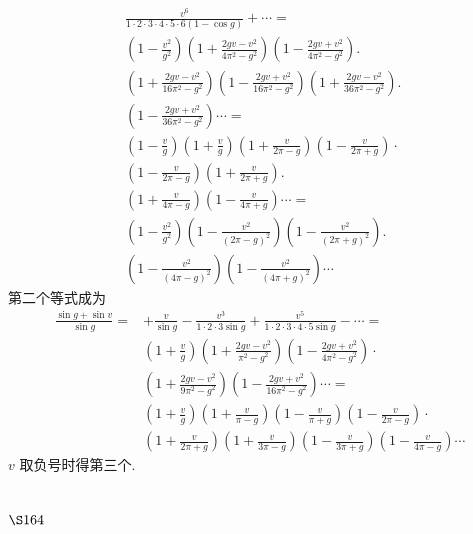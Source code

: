 \[
\begin{aligned}
& \frac{v^{6}}{1 \cdot 2 \cdot 3 \cdot 4 \cdot 5 \cdot 6(1-\cos g)}+\cdots= \\
& \left(1-\frac{v^{2}}{g^{2}}\right)\left(1+\frac{2 g v-v^{2}}{4 \pi^{2}-g^{2}}\right)\left(1-\frac{2 g v+v^{2}}{4 \pi^{2}-g^{2}}\right) \text {. } \\
& \left(1+\frac{2 g v-v^{2}}{16 \pi^{2}-g^{2}}\right)\left(1-\frac{2 g v+v^{2}}{16 \pi^{2}-g^{2}}\right)\left(1+\frac{2 g v-v^{2}}{36 \pi^{2}-g^{2}}\right) \text {. } \\
& \left(1-\frac{2 g v+v^{2}}{36 \pi^{2}-g^{2}}\right) \cdots= \\
& \left(1-\frac{v}{g}\right)\left(1+\frac{v}{g}\right)\left(1+\frac{v}{2 \pi-g}\right)\left(1-\frac{v}{2 \pi+g}\right) \cdot \\
& \left(1-\frac{v}{2 \pi-g}\right)\left(1+\frac{v}{2 \pi+g}\right) \text {. } \\
& \left(1+\frac{v}{4 \pi-g}\right)\left(1-\frac{v}{4 \pi+g}\right) \cdots= \\
& \left(1-\frac{v^{2}}{g^{2}}\right)\left(1-\frac{v^{2}}{(2 \pi-g)^{2}}\right)\left(1-\frac{v^{2}}{(2 \pi+g)^{2}}\right) \text {. } \\
& \left(1-\frac{v^{2}}{(4 \pi-g)^{2}}\right)\left(1-\frac{v^{2}}{(4 \pi+g)^{2}}\right) \cdots
\end{aligned}
\]
第二个等式成为
\[
\begin{aligned}
\frac{\sin g+\sin v}{\sin g}= & +\frac{v}{\sin g}-\frac{v^{3}}{1 \cdot 2 \cdot 3 \sin g}+\frac{v^{5}}{1 \cdot 2 \cdot 3 \cdot 4 \cdot 5 \sin g}-\cdots= \\
& \left(1+\frac{v}{g}\right)\left(1+\frac{2 g v-v^{2}}{\pi^{2}-g^{2}}\right)\left(1-\frac{2 g v+v^{2}}{4 \pi^{2}-g^{2}}\right) \cdot \\
& \left(1+\frac{2 g v-v^{2}}{9 \pi^{2}-g^{2}}\right)\left(1-\frac{2 g v+v^{2}}{16 \pi^{2}-g^{2}}\right) \cdots= \\
& \left(1+\frac{v}{g}\right)\left(1+\frac{v}{\pi-g}\right)\left(1-\frac{v}{\pi+g}\right)\left(1-\frac{v}{2 \pi-g}\right) \cdot \\
& \left(1+\frac{v}{2 \pi+g}\right)\left(1+\frac{v}{3 \pi-g}\right)\left(1-\frac{v}{3 \pi+g}\right)\left(1-\frac{v}{4 \pi-g}\right) \cdots
\end{aligned}
\]
$v$ 取负号时得第三个.

\section{$\S 164$}

